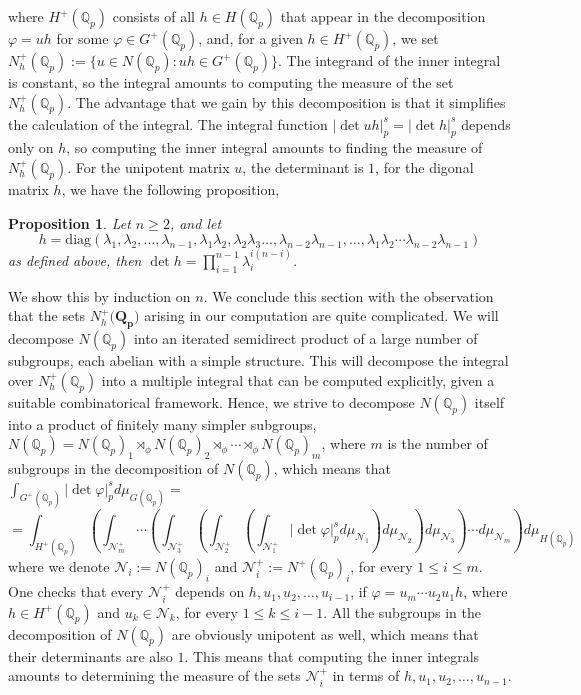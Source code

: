 \documentclass[12pt]{article}
\newtheorem{proposition}[theorem]{Proposition}
\begin{document}
where $H^+(\mathbb{Q}_p)$ consists of all $h\in H(\mathbb{Q}_p)$ that appear in the decomposition $\varphi=uh$ for some $\varphi\in G^+(\mathbb{Q}_p)$, and, for a given $h\in H^+(\mathbb{Q}_p)$, we set $N_h^+(\mathbb{Q}_p):=\{u\in N(\mathbb{Q}_p) : uh\in{G}^+(\mathbb{Q}_p)\}$. The integrand of the inner integral is constant, so the integral amounts to computing the measure of the set $N_{h}^+(\mathbb{Q}_p)$. The advantage that we gain by this decomposition is that it simplifies the calculation of the integral. The integral function $|\det{uh}|_p^s=|\det{h}|_p^s$ depends only on $h$, so computing the inner integral amounts to finding the measure of $N_{h}^+(\mathbb{Q}_p)$. For the unipotent matrix $u$, the determinant is $1$, for the digonal matrix $h$, we have the following proposition,
\begin{proposition}
\label{prop.h.matrix.determinant}
Let $n\geq{2}$, and let \[h=\mathrm{diag}(\lambda_{1},\lambda_{2},\dots,\lambda_{n-1},\lambda_{1}\lambda_{2},\lambda_{2}\lambda_{3}\dots,\lambda_{n-2}\lambda_{n-1},\dots,\lambda_{1}\lambda_{2}\cdots\lambda_{n-2}\lambda_{n-1})\]
as defined above, then $\det{h}=\prod_{i=1}^{n-1}\lambda_i^{i(n-i)}$.
\end{proposition}
We show this by induction on $n$.
We conclude this section with the observation that the sets $N_{h}^+(\mathbf{{Q}_p)}$ arising in our computation are quite complicated. We will decompose $N(\mathbb{Q}_p)$ into an iterated semidirect product of a large number of subgroups, each abelian with a simple structure. This will decompose the integral over $N_{h}^+(\mathbb{Q}_p)$ into a multiple integral that can be computed explicitly, given a suitable combinatorical framework. Hence, we strive to decompose $N(\mathbb{Q}_p)$ itself into a product of finitely many simpler subgroups, $N(\mathbb{Q}_p)= N(\mathbb{Q}_p)_1\rtimes_{\phi} N(\mathbb{Q}_p)_2\rtimes_{\phi}\cdots\rtimes_{\phi} N(\mathbb{Q}_p)_{m}$, where $m$ is the number of subgroups in the decomposition of $N(\mathbb{Q}_p)$, which means that $\displaystyle\int_{G^+(\mathbb{Q}_p)}|\det\varphi|_p^sd\mu_{G(\mathbb{Q}_p)}=$\[=\displaystyle\int_{H^+(\mathbb{Q}_p)}\left(\displaystyle\int_{\mathcal{N}^+_{m}}\cdots\left(\displaystyle\int_{\mathcal{N}^+_3}\left(\displaystyle\int_{\mathcal{N}^+_2}\left(\displaystyle\int_{\mathcal{N}^+_1}|\det\varphi|_p^sd\mu_{\mathcal{N}_1}\right)d\mu_{\mathcal{N}_2}\right)d\mu_{\mathcal{N}_3}\right)\cdots d\mu_{\mathcal{N}_{m}}\right)d\mu_{H(\mathbb{Q}_p)}\]
where we denote $\mathcal{N}_i:=N(\mathbb{Q}_p)_i$ and $\mathcal{N}^+_i:=N^+(\mathbb{Q}_p)_i$, for every $1\leq i\leq m$. One checks that every $\mathcal{N}^+_i$ depends on $h,u_1,u_2,\dots,u_{i-1}$, if $\varphi=u_{m}\cdots{u_2}{u_1}h$, where $h\in H^+(\mathbb{Q}_p)$ and $u_k\in\mathcal{N}_{k}$, for every $1\leq k\leq i-1$. 
All the subgroups in the decomposition of $N(\mathbb{Q}_p)$ are obviously unipotent as well, which means that their determinants are also $1$. This means that computing the inner integrals amounts to determining the measure of the sets $\mathcal{N}^+_i$ in terms of $h,u_1,u_2,\dots,u_{n-1}$.
\end{document}
